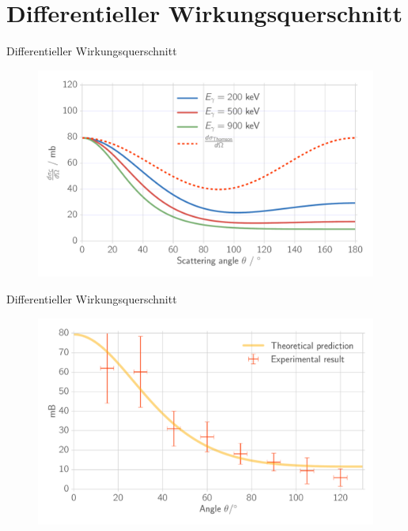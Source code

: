 \documentclass[xcolor=x11names,compress]{beamer}
\renewcommand{\(}{\begin{columns}}
\renewcommand{\)}{\end{columns}}
\newcommand{\<}[1]{\begin{column}{#1}}
\renewcommand{\>}{\end{column}}
\begin{document}
\section{Differentieller Wirkungsquerschnitt}
\begin{frame}[t]{Differentieller Wirkungsquerschnitt}
\begin{figure}[htpb]
    \centering
    \includegraphics[width=1.0\linewidth]{../analysis/figures/theory_diff_cs}
\label{fig:theory_diff}
\end{figure}
\end{frame}

\begin{frame}[t]{Differentieller Wirkungsquerschnitt}
\begin{figure}[htpb]
    \centering
    \includegraphics[width=1.0\linewidth]{../analysis/figures/na_cross_section}
\label{fig:theory_diff}
\end{figure}
\end{frame}
\end{document}
